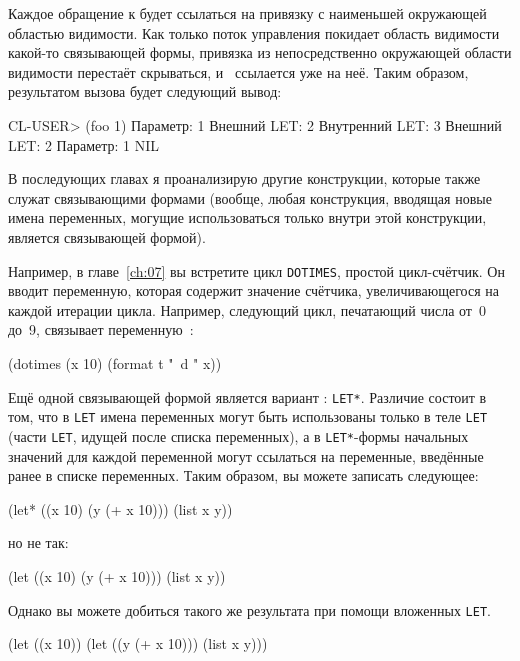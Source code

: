 Каждое обращение к  будет ссылаться на привязку с наименьшей окружающей областью
видимости. Как только поток управления покидает область видимости какой-то связывающей
формы, привязка из непосредственно окружающей области видимости перестаёт скрываться,
и~ ссылается уже на неё. Таким образом, результатом вызова  будет
следующий вывод:

\begin{myverb}
  CL-USER> (foo 1)
  Параметр: 1
  Внешний LET: 2
  Внутренний LET: 3
  Внешний LET: 2
  Параметр: 1
  NIL
\end{myverb}

В последующих главах я проанализирую другие конструкции, которые также служат связывающими
формами (вообще, любая конструкция, вводящая новые имена переменных, могущие
использоваться только внутри этой конструкции, является связывающей формой).

Например, в главе~\ref{ch:07} вы встретите цикл \lstinline{DOTIMES}, простой цикл-счётчик. Он
вводит переменную, которая содержит значение счётчика, увеличивающегося на каждой итерации
цикла. Например, следующий цикл, печатающий числа от~0 до~9, связывает переменную~:

\begin{myverb}
  (dotimes (x 10) (format t "~d " x))
\end{myverb}

Ещё одной связывающей формой является вариант : \lstinline{LET*}. Различие
состоит в том, что в \lstinline{LET} имена переменных могут быть использованы только в теле
\lstinline{LET} (части \lstinline{LET}, идущей после списка переменных), а в \lstinline{LET*}-формы
начальных значений для каждой переменной могут ссылаться на переменные, введённые ранее в
списке переменных. Таким образом, вы можете записать следующее:

\begin{myverb}
  (let* ((x 10)
         (y (+ x 10)))
    (list x y))
\end{myverb}

\noindent{}но не так:

\begin{myverb}
  (let ((x 10)
        (y (+ x 10)))
    (list x y))
\end{myverb}

Однако вы можете добиться такого же результата при помощи вложенных \lstinline{LET}.

\begin{myverb}
  (let ((x 10))
    (let ((y (+ x 10)))
      (list x y)))
\end{myverb}

